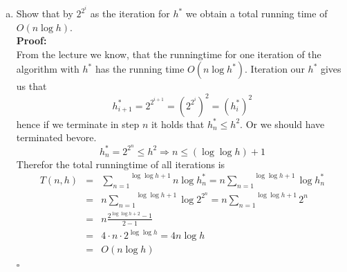\documentclass[11pt,a4paper,ngerman]{article}
\begin{document}
\begin{description}
\begin{enumerate}[a)]
    \item Show that by $2^{2^i}$ as the iteration for $h^*$ we obtain
        a total running time of $O(n \log h)$.\\
    \textbf{Proof:}\\
        From the lecture we know, that the runningtime for
        one iteration of the algorithm with $h^*$ has the running time
        $O(n \log h^*)$.
        Iteration our $h^*$ gives us that 
        $$
            h^*_{i+1} = 2^{2^{i+1}} = \left( 2^{2^i}\right)^2 = \left( h^*_i \right)^2
        $$
        hence if we terminate in step $n$ it holds that $h^*_n \leq h^2$. Or
        we should have terminated bevore.\\
        \begin{equation}
            h^*_n = 2^{2^n} \leq h^2 \Rightarrow n \leq (\log \log h) + 1
        \end{equation}
        Therefor the total runningtime of all iterations is
        \begin{equation}
        \begin{aligned}
            T(n, h) &=& \overset{\log \log h + 1}{\underset{n = 1}{\sum}} n \log h^*_n
            = n \overset{\log \log h + 1}{\underset{n=1}{\sum}} \log h^*_n\\
            &=& n \overset{\log \log h + 1}{\underset{n=1}{\sum}} \log 2^{2^n}
            = n \overset{\log \log h + 1}{\underset{n=1}{\sum}} 2^n\\
            &=& n \frac{2^{\log \log h + 2} - 1}{2 - 1}\\
            &=& 4 \cdot n \cdot 2^{\log \log h}
            = 4 n \log h\\
            &=& O (n \log h)
        \end{aligned}
        \end{equation}
    \mbox{}\hfill$\square$
  \end{enumerate}

\end{description}

\label{LastPage}
\end{document}
